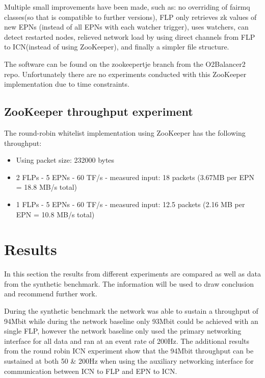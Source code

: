 \documentclass[]{article}
\begin{document}
Multiple small improvements have been made, such as: no overriding of fairmq classes(so that is compatible to further versions), FLP only retrieves zk values of new EPNs (instead of all EPNs with each watcher trigger), uses watchers, can detect restarted nodes, relieved network load by using direct channels from FLP to ICN(instead of using ZooKeeper), and finally a simpler file structure.

The software can be found on the zookeepertje\cite{zookeepertje} branch from the O2Balancer2 repo. Unfortunately there are no experiments conducted with this ZooKeeper implementation due to time constraints.

\subsection{ZooKeeper throughput experiment} 
The round-robin whitelist implementation using ZooKeeper has the following throughput:
\begin{itemize}
	\itemsep 0em
	\item Using packet size: 232000 bytes
	\item 2 FLPs - 5 EPNs - 60 TF/s - measured input: 18 packets (3.67MB per EPN = 18.8 MB/s total)
	\item 1 FLPs - 5 EPNs - 60 TF/s - measured input: 12.5 packets (2.16 MB per EPN = 10.8 MB/s total)
\end{itemize}

\section{Results}
In this section the results from different experiments are compared as well as data from the synthetic benchmark. The information will be used to draw conclusion and recommend further work.

During the synthetic benchmark the network was able to sustain a throughput of 94Mbit while during the network baseline only 93Mbit could be achieved with an single FLP, however the network baseline only used the primary networking interface for all data and ran at an event rate of 200Hz. The additional results from the round robin ICN experiment show that the 94Mbit throughput can be sustained at both 50 \& 200Hz when using the auxiliary networking interface for communication between ICN to FLP and EPN to ICN.
\end{document}
